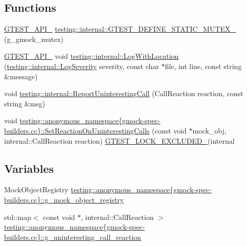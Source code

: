 \subsection*{Functions}
\begin{DoxyCompactItemize}
\item 
\hyperlink{gtest-port_8h_aa73be6f0ba4a7456180a94904ce17790}{G\+T\+E\+S\+T\+\_\+\+A\+P\+I\+\_\+} \hyperlink{namespacetesting_1_1internal_a8c4aa7be8daa7b60e293071d70a89584}{testing\+::internal\+::\+G\+T\+E\+S\+T\+\_\+\+D\+E\+F\+I\+N\+E\+\_\+\+S\+T\+A\+T\+I\+C\+\_\+\+M\+U\+T\+E\+X\+\_\+} (g\+\_\+gmock\+\_\+mutex)
\item 
\hyperlink{gtest-port_8h_aa73be6f0ba4a7456180a94904ce17790}{G\+T\+E\+S\+T\+\_\+\+A\+P\+I\+\_\+} void \hyperlink{namespacetesting_1_1internal_af271cd1fc0b62a7f4736cb3109e86a37}{testing\+::internal\+::\+Log\+With\+Location} (\hyperlink{namespacetesting_1_1internal_a203d1a8a2147a53d12bbdae40d443914}{testing\+::internal\+::\+Log\+Severity} severity, const char $\ast$file, int line, const string \&message)
\item 
void \hyperlink{namespacetesting_1_1internal_a8d99a1e87d0cea563b2bfad8a4e65276}{testing\+::internal\+::\+Report\+Uninteresting\+Call} (Call\+Reaction reaction, const string \&msg)
\item 
void \hyperlink{namespacetesting_1_1anonymous__namespace_02gmock-spec-builders_8cc_03_a4b6c5727bdd640c48b03da3a39b66f8e}{testing\+::anonymous\+\_\+namespace\{gmock-\/spec-\/builders.\+cc\}\+::\+Set\+Reaction\+On\+Uninteresting\+Calls} (const void $\ast$mock\+\_\+obj, internal\+::\+Call\+Reaction reaction) \hyperlink{gtest-port_8h_a69abff5a4efdd07bd5faebe3dd318d06}{G\+T\+E\+S\+T\+\_\+\+L\+O\+C\+K\+\_\+\+E\+X\+C\+L\+U\+D\+E\+D\+\_\+}(internal
\end{DoxyCompactItemize}
\subsection*{Variables}
\begin{DoxyCompactItemize}
\item 
Mock\+Object\+Registry \hyperlink{namespacetesting_1_1anonymous__namespace_02gmock-spec-builders_8cc_03_a41848551bdaeda82b291e868de355fc7}{testing\+::anonymous\+\_\+namespace\{gmock-\/spec-\/builders.\+cc\}\+::g\+\_\+mock\+\_\+object\+\_\+registry}
\item 
std\+::map$<$ const void $\ast$, internal\+::\+Call\+Reaction $>$ \hyperlink{namespacetesting_1_1anonymous__namespace_02gmock-spec-builders_8cc_03_ab456ef4b8025f61463aa08ba4098dceb}{testing\+::anonymous\+\_\+namespace\{gmock-\/spec-\/builders.\+cc\}\+::g\+\_\+uninteresting\+\_\+call\+\_\+reaction}
\end{DoxyCompactItemize}
